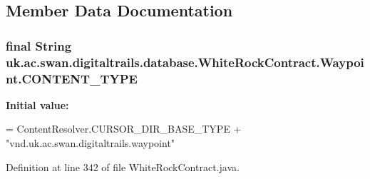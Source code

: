 \subsection{Member Data Documentation}
\hypertarget{classuk_1_1ac_1_1swan_1_1digitaltrails_1_1database_1_1_white_rock_contract_1_1_waypoint_ae5f4f0f1a43cecb919c00282a2283a55}{
\subsubsection[{C\+O\+N\+T\+E\+N\+T\+\_\+\+T\+Y\+P\+E}]{\setlength{\rightskip}{0pt plus 5cm}final String uk.\+ac.\+swan.\+digitaltrails.\+database.\+White\+Rock\+Contract.\+Waypoint.\+C\+O\+N\+T\+E\+N\+T\+\_\+\+T\+Y\+P\+E\hspace{0.3cm}{\ttfamily [static]}}}\label{classuk_1_1ac_1_1swan_1_1digitaltrails_1_1database_1_1_white_rock_contract_1_1_waypoint_ae5f4f0f1a43cecb919c00282a2283a55}
{\bfseries Initial value\+:}
\begin{DoxyCode}
= ContentResolver.CURSOR\_DIR\_BASE\_TYPE +
                \textcolor{stringliteral}{"vnd.uk.ac.swan.digitaltrails.waypoint"}
\end{DoxyCode}


Definition at line 342 of file White\+Rock\+Contract.\+java.

